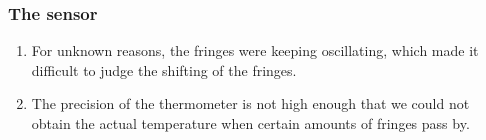 \documentclass[10pt,a4paper,twocolumn,twoside,UTF8]{article}
\begin{document}
	\subsubsection{The sensor}
	\begin{enumerate}[label=\arabic*.]
		\item For unknown reasons, the fringes were keeping oscillating, which made it difficult to judge the shifting of the fringes.
		\item The precision of the thermometer is not high enough that we could not obtain the actual temperature when certain amounts of fringes pass by.
	\end{enumerate}
	

\printbibliography[title=Reference] 
\end{document}
